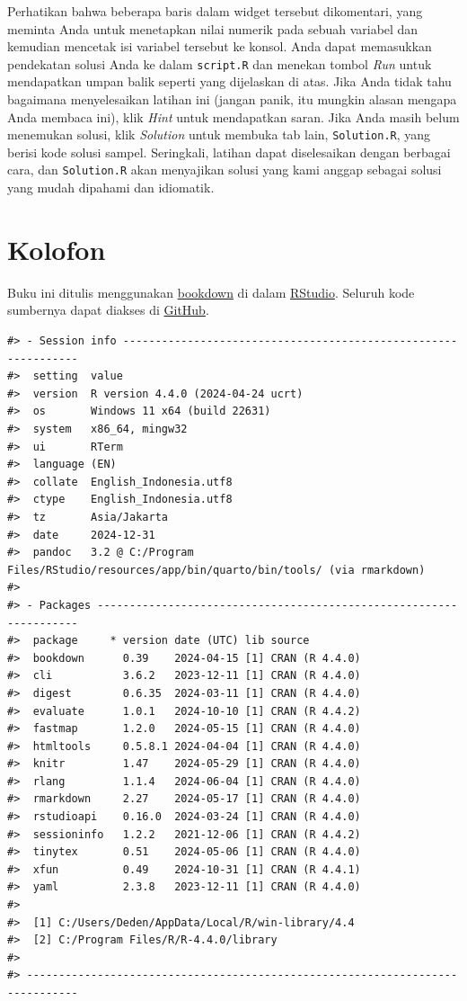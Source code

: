 \documentclass[
  oneside]{book}
\begin{document}
Perhatikan bahwa beberapa baris dalam widget tersebut dikomentari, yang meminta Anda untuk menetapkan nilai numerik pada sebuah variabel dan kemudian mencetak isi variabel tersebut ke konsol. Anda dapat memasukkan pendekatan solusi Anda ke dalam \texttt{script.R} dan menekan tombol \emph{Run} untuk mendapatkan umpan balik seperti yang dijelaskan di atas. Jika Anda tidak tahu bagaimana menyelesaikan latihan ini (jangan panik, itu mungkin alasan mengapa Anda membaca ini), klik \emph{Hint} untuk mendapatkan saran. Jika Anda masih belum menemukan solusi, klik \emph{Solution} untuk membuka tab lain, \texttt{Solution.R}, yang berisi kode solusi sampel. Seringkali, latihan dapat diselesaikan dengan berbagai cara, dan \texttt{Solution.R} akan menyajikan solusi yang kami anggap sebagai solusi yang mudah dipahami dan idiomatik.

\section{Kolofon}\label{kolofon}

Buku ini ditulis menggunakan \href{http://bookdown.org/}{bookdown} di dalam \href{http://www.rstudio.com/ide/}{RStudio}. Seluruh kode sumbernya dapat diakses di \href{https://github.com/dedenistiawan/ClustR}{GitHub}.

\begin{verbatim}
#> - Session info ---------------------------------------------------------------
#>  setting  value
#>  version  R version 4.4.0 (2024-04-24 ucrt)
#>  os       Windows 11 x64 (build 22631)
#>  system   x86_64, mingw32
#>  ui       RTerm
#>  language (EN)
#>  collate  English_Indonesia.utf8
#>  ctype    English_Indonesia.utf8
#>  tz       Asia/Jakarta
#>  date     2024-12-31
#>  pandoc   3.2 @ C:/Program Files/RStudio/resources/app/bin/quarto/bin/tools/ (via rmarkdown)
#> 
#> - Packages -------------------------------------------------------------------
#>  package     * version date (UTC) lib source
#>  bookdown      0.39    2024-04-15 [1] CRAN (R 4.4.0)
#>  cli           3.6.2   2023-12-11 [1] CRAN (R 4.4.0)
#>  digest        0.6.35  2024-03-11 [1] CRAN (R 4.4.0)
#>  evaluate      1.0.1   2024-10-10 [1] CRAN (R 4.4.2)
#>  fastmap       1.2.0   2024-05-15 [1] CRAN (R 4.4.0)
#>  htmltools     0.5.8.1 2024-04-04 [1] CRAN (R 4.4.0)
#>  knitr         1.47    2024-05-29 [1] CRAN (R 4.4.0)
#>  rlang         1.1.4   2024-06-04 [1] CRAN (R 4.4.0)
#>  rmarkdown     2.27    2024-05-17 [1] CRAN (R 4.4.0)
#>  rstudioapi    0.16.0  2024-03-24 [1] CRAN (R 4.4.0)
#>  sessioninfo   1.2.2   2021-12-06 [1] CRAN (R 4.4.2)
#>  tinytex       0.51    2024-05-06 [1] CRAN (R 4.4.0)
#>  xfun          0.49    2024-10-31 [1] CRAN (R 4.4.1)
#>  yaml          2.3.8   2023-12-11 [1] CRAN (R 4.4.0)
#> 
#>  [1] C:/Users/Deden/AppData/Local/R/win-library/4.4
#>  [2] C:/Program Files/R/R-4.4.0/library
#> 
#> ------------------------------------------------------------------------------
\end{verbatim}
\end{document}
